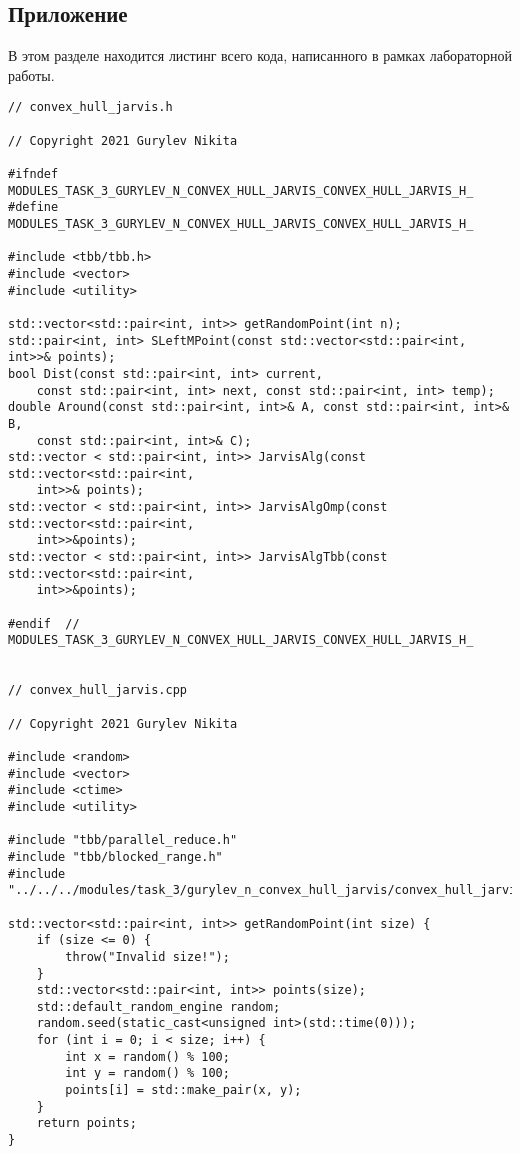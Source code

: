 \documentclass{report}
\begin{document}
\begin{center}
\section*{Приложение}
\end{center}
В этом разделе находится листинг всего кода, написанного в рамках лабораторной работы.
\begin{lstlisting}
// convex_hull_jarvis.h

// Copyright 2021 Gurylev Nikita

#ifndef MODULES_TASK_3_GURYLEV_N_CONVEX_HULL_JARVIS_CONVEX_HULL_JARVIS_H_
#define MODULES_TASK_3_GURYLEV_N_CONVEX_HULL_JARVIS_CONVEX_HULL_JARVIS_H_

#include <tbb/tbb.h>
#include <vector>
#include <utility>

std::vector<std::pair<int, int>> getRandomPoint(int n);
std::pair<int, int> SLeftMPoint(const std::vector<std::pair<int, int>>& points);
bool Dist(const std::pair<int, int> current,
    const std::pair<int, int> next, const std::pair<int, int> temp);
double Around(const std::pair<int, int>& A, const std::pair<int, int>& B,
    const std::pair<int, int>& C);
std::vector < std::pair<int, int>> JarvisAlg(const std::vector<std::pair<int,
    int>>& points);
std::vector < std::pair<int, int>> JarvisAlgOmp(const std::vector<std::pair<int,
    int>>&points);
std::vector < std::pair<int, int>> JarvisAlgTbb(const std::vector<std::pair<int,
    int>>&points);

#endif  // MODULES_TASK_3_GURYLEV_N_CONVEX_HULL_JARVIS_CONVEX_HULL_JARVIS_H_


// convex_hull_jarvis.cpp

// Copyright 2021 Gurylev Nikita

#include <random>
#include <vector>
#include <ctime>
#include <utility>

#include "tbb/parallel_reduce.h"
#include "tbb/blocked_range.h"
#include "../../../modules/task_3/gurylev_n_convex_hull_jarvis/convex_hull_jarvis.h"

std::vector<std::pair<int, int>> getRandomPoint(int size) {
    if (size <= 0) {
        throw("Invalid size!");
    }
    std::vector<std::pair<int, int>> points(size);
    std::default_random_engine random;
    random.seed(static_cast<unsigned int>(std::time(0)));
    for (int i = 0; i < size; i++) {
        int x = random() % 100;
        int y = random() % 100;
        points[i] = std::make_pair(x, y);
    }
    return points;
}


\end{lstlisting}
\end{document}
